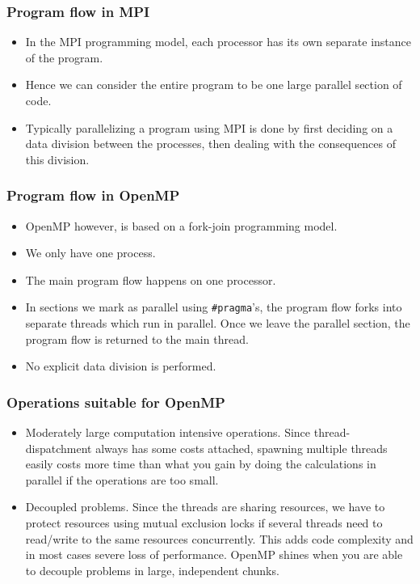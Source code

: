\begin{frame}
  \frametitle{Program flow in MPI}
  \begin{center}
    \scalebox{0.8}{}
  \end{center}
  \begin{itemize}
  \item In the MPI programming model, each processor has its own separate
    instance of the program.
  \item Hence we can consider the entire program to be one large parallel
    section of code.
  \item Typically parallelizing a program using MPI is done by first deciding on
    a data division between the processes, then dealing with the consequences of
    this division.
  \end{itemize}
\end{frame}

\begin{frame}
  \frametitle{Program flow in OpenMP}
  \begin{center}
    \scalebox{0.8}{}
  \end{center}
  \begin{itemize}
  \item OpenMP however, is based on a fork-join programming model.
  \item We only have one process.
  \item The main program flow happens on one processor.
  \item In sections we mark as parallel using \texttt{\#pragma}'s, the program
    flow forks into separate threads which run in parallel. Once we leave the
    parallel section, the program flow is returned to the main thread.
  \item No explicit data division is performed.
  \end{itemize}
\end{frame}

\begin{frame}
  \frametitle{Operations suitable for OpenMP}
  \begin{itemize}
  \item Moderately large computation intensive operations. Since
    thread-dispatchment always has some costs attached, spawning multiple
    threads easily costs more time than what you gain by doing the calculations
    in parallel if the operations are too small.
  \item Decoupled problems. Since the threads are sharing resources, we have to
    protect resources using mutual exclusion locks if several threads need to
    read/write to the same resources concurrently. This adds code complexity and
    in most cases severe loss of performance. OpenMP shines when you are able to
    decouple problems in large, independent chunks.
  \end{itemize}
\end{frame}

